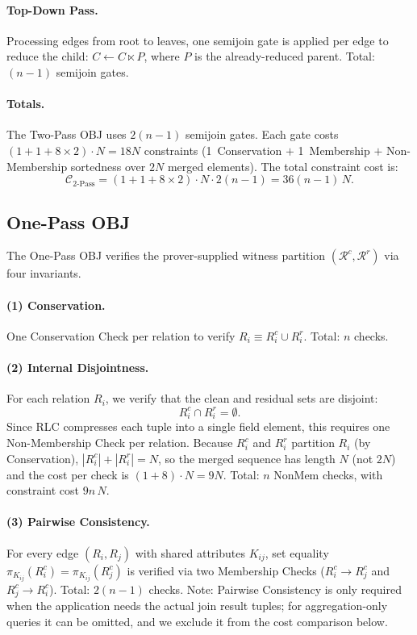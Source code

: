 \documentclass[sigconf]{acmart}
\begin{document}
\paragraph{Top-Down Pass.}
Processing edges from root to leaves, one semijoin gate is applied per edge to reduce the child: $C \leftarrow C \ltimes P$, where $P$ is the already-reduced parent.
Total: $(n-1)$ semijoin gates.

\paragraph{Totals.}
The Two-Pass OBJ uses $2(n{-}1)$ semijoin gates.
Each gate costs $(1 + 1 + 8 \times 2) \cdot N = 18N$ constraints (1~Conservation $+$ 1~Membership $+$ Non-Membership sortedness over $2N$ merged elements).
The total constraint cost is:
\[
\mathcal{C}_{\text{2-Pass}} = (1+1+8 \times 2) \cdot N \cdot 2(n{-}1) = 36(n{-}1)\,N.
\]

\subsection{One-Pass OBJ}

The One-Pass OBJ verifies the prover-supplied witness partition $(\mathcal{R}^c, \mathcal{R}^r)$ via four invariants.

\paragraph{(1) Conservation.}
One Conservation Check per relation to verify $R_i \equiv R_i^c \cup R_i^r$.
Total: $n$ checks.

\paragraph{(2) Internal Disjointness.}
For each relation $R_i$, we verify that the clean and residual sets are disjoint:
\[
R_i^c \cap R_i^r = \emptyset.
\]
Since RLC compresses each tuple into a single field element, this requires one Non-Membership Check per relation.
Because $R_i^c$ and $R_i^r$ partition $R_i$ (by Conservation), $|R_i^c| + |R_i^r| = N$, so the merged sequence has length $N$ (not $2N$) and the cost per check is $(1+8) \cdot N = 9N$.
Total: $n$ NonMem checks, with constraint cost $9n\,N$.

\paragraph{(3) Pairwise Consistency.}
For every edge $(R_i, R_j)$ with shared attributes $K_{ij}$, set equality $\pi_{K_{ij}}(R_i^c) = \pi_{K_{ij}}(R_j^c)$ is verified via two Membership Checks ($R_i^c \to R_j^c$ and $R_j^c \to R_i^c$).
Total: $2(n-1)$ checks.
Note: Pairwise Consistency is only required when the application needs the actual join result tuples; for aggregation-only queries it can be omitted, and we exclude it from the cost comparison below.
\end{document}
